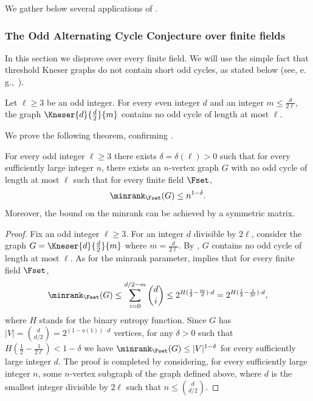 We gather below several applications of .

\subsubsection{The Odd Alternating Cycle Conjecture over finite fields}

%
In this section we disprove %
 over every finite field.
We will use the simple fact that
%
threshold Kneser graphs   %
do not contain short odd cycles, as stated below (see, e.\,g.,~\cite{Denley97,Haviv18free}).

\begin{lemma}\label{lemma:cycle_K}
Let $\ell \geq 3$ be an odd integer.
For every even integer $d$ and an integer $m \leq \frac{d}{2\ell}$, the graph $\Kneser{d}{\frac{d}{2}}{m}$ contains no odd cycle of length at most $\ell$.
\end{lemma}

We prove the following theorem, confirming .

\begin{theorem}\label{thm:Cycles}
For every odd integer $\ell \geq 3$ there exists $\delta = \delta(\ell) >0$ such that for every sufficiently large integer $n$, there exists an $n$-vertex graph $G$ with no odd cycle of length at most $\ell$ such that for every finite field $\Fset$,
\[{\minrank}_{\Fset}(G) \leq n^{1-\delta}.\]
Moreover, the bound on the minrank can be achieved by a symmetric matrix.
\end{theorem}

\begin{proof}
Fix an odd integer $\ell \geq 3$.
For an integer $d$ divisible by $2 \ell$, consider the graph $G = \Kneser{d}{\frac{d}{2}}{m}$ where $m = \frac{d}{2 \ell}$.
By , $G$ contains no odd cycle of length at most $\ell$.
As for the minrank parameter,  implies that for every finite field $\Fset$,
\[{\minrank}_{\Fset}(G) \leq \sum_{i=0}^{d/2-m}\binom{d}{i} \leq 2^{H(\frac{1}{2}-\frac{m}{d}) \cdot d} = 2^{H(\frac{1}{2}-\frac{1}{2\ell}) \cdot d},\]
where $H$ stands for the binary entropy function.
Since $G$ has $|V| = \binom{d}{d/2} = 2^{(1-o(1)) \cdot d}$ vertices, for any $\delta>0$ such that $H(\frac{1}{2}-\frac{1}{2\ell}) < 1-\delta$ we have ${\minrank}_{\Fset}(G) \leq |V|^{1-\delta}$ for every sufficiently large integer $d$.
The proof is completed by considering, for every sufficiently large integer $n$, some $n$-vertex subgraph of the graph defined above, where $d$ is the smallest integer divisible by $2\ell$ such that $n \leq \binom{d}{d/2}$.
\end{proof}


